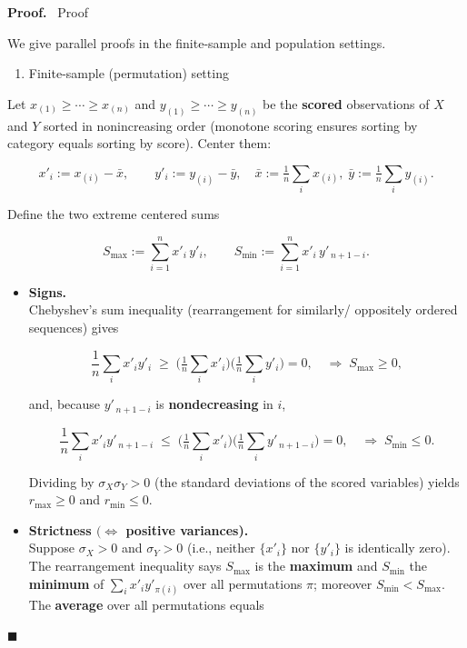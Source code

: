 \documentclass[
  12pt,
]{article}
\providecommand{\tightlist}{%
  \setlength{\itemsep}{0pt}\setlength{\parskip}{0pt}}
\theoremstyle{plain}
\theoremstyle{definition}
\renewenvironment{proof}
   {\par\noindent\textbf{Proof.}\ }
   {\hfill$\blacksquare$\par}
\theoremstyle{remark}
\begin{document}
\begin{proof}
Proof

We give parallel proofs in the finite-sample and population settings.

\begin{enumerate}
\def\labelenumi{\Alph{enumi})}
\tightlist
\item
  Finite-sample (permutation) setting
\end{enumerate}

Let \(x_{(1)}\ge\cdots\ge x_{(n)}\) and \(y_{(1)}\ge\cdots\ge y_{(n)}\)
be the \textbf{scored} observations of \(X\) and \(Y\) sorted in
nonincreasing order (monotone scoring ensures sorting by category equals
sorting by score). Center them:

\[x'_i := x_{(i)}-\bar x,\qquad y'_i := y_{(i)}-\bar y,\quad  
\bar x := \tfrac1n\sum_i x_{(i)},\;\bar y := \tfrac1n\sum_i y_{(i)}.\]

Define the two extreme centered sums

\[S_{\max} := \sum_{i=1}^n x'_i\,y'_i,\qquad  
S_{\min} := \sum_{i=1}^n x'_i\,y'_{\,n+1-i}.\]

\begin{itemize}
\item
  \textbf{Signs.}\\
  Chebyshev's sum inequality (rearrangement for similarly/ oppositely
  ordered sequences) gives

  \[\frac1n\sum_i x'_i y'_i \;\ge\; \Big(\tfrac1n\sum_i x'_i\Big)\Big(\tfrac1n\sum_i y'_i\Big)=0,  
    \quad\Rightarrow\; S_{\max}\ge 0,\]

  and, because \(y'_{\,n+1-i}\) is \textbf{nondecreasing} in \(i\),

  \[\frac1n\sum_i x'_i y'_{\,n+1-i} \;\le\; \Big(\tfrac1n\sum_i x'_i\Big)\Big(\tfrac1n\sum_i y'_{\,n+1-i}\Big)=0,  
    \quad\Rightarrow\; S_{\min}\le 0.\]

  Dividing by \(\sigma_X\sigma_Y>0\) (the standard deviations of the
  scored variables) yields \(r_{\max}\ge 0\) and \(r_{\min}\le 0\).
\item
  \textbf{Strictness \((\Leftrightarrow\) positive variances).}\\
  Suppose \(\sigma_X>0\) and \(\sigma_Y>0\) (i.e., neither \(\{x'_i\}\)
  nor \(\{y'_i\}\) is identically zero). The rearrangement inequality
  says \(S_{\max}\) is the \textbf{maximum} and \(S_{\min}\) the
  \textbf{minimum} of \(\sum_i x'_i y'_{\pi(i)}\) over all permutations
  \(\pi\); moreover \(S_{\min}<S_{\max}\). The \textbf{average} over all
  permutations equals


\end{itemize}
\end{proof}
\end{document}
